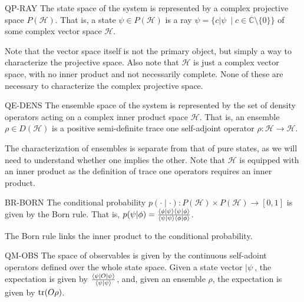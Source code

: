 \begin{condition}{QP-RAY}
	The state space of the system is represented by a complex projective space $P(\mathcal{H})$. That is, a state $\psi \in P(\mathcal{H})$ is a ray $\psi = \{c |\psi\> \mid c \in \mathbb{C} \setminus \{ 0\} \}$ of some complex vector space $\mathcal{H}$.
\end{condition}

Note that the vector space itself is not the primary object, but simply a way to characterize the projective space. Also note that $\mathcal{H}$ is just a complex vector space, with no inner product and not necessarily complete. None of these are necessary to characterize the complex projective space.

\begin{condition}{QE-DENS}
	The ensemble space of the system is represented by the set of density operators acting on a complex inner product space $\mathcal{H}$. That is, an ensemble $\rho \in D(\mathcal{H})$ is a positive semi-definite trace one self-adjoint operator $\rho : \mathcal{H} \to \mathcal{H}$. 
\end{condition}

The characterization of ensembles is separate from that of pure states, as we will need to understand whether one implies the other. Note that $\mathcal{H}$ is equipped with an inner product as the definition of trace one operators requires an inner product.

\begin{condition}{BR-BORN}
	The conditional probability $p( \cdot \mid \cdot) : P(\mathcal{H}) \times P(\mathcal{H}) \to [0,1]$ is given by the Born rule. That is, $p(\psi|\phi) = \frac{\langle \phi | \psi \rangle\langle \psi | \phi \rangle}{\langle \psi | \psi \rangle\langle \phi | \phi \rangle}$.
\end{condition}

The Born rule links the inner product to the conditional probability.

\begin{condition}{QM-OBS}
	The space of observables is given by the continuous self-adoint operators defined over the whole state space. Given a state vector $|\psi\>$, the expectation is given by $\frac{\langle\psi | O | \psi \rangle}{\langle\psi | \psi \rangle}$, and, given an ensemble $\rho$, the expectation is given by $\operatorname{tr}(O\rho)$.
\end{condition}

